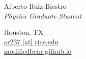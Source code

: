 \documentclass[letterpaper,11pt,notitlepage]{article}
\newcommand{\hmargin}{1.7cm} %
\begin{document}
\pagestyle{fancy}
\begin{minipage}[t][\hmargin][c]{0.60\textwidth}
	
    {\Huge{Alberto Ruiz-Biestro} }\\[0.8em]
	{\color{darkgray}\itshape\Large Physics Graduate Student}
	
\end{minipage}
\hfill
\begin{minipage}[t][\hmargin][c]{0.35\textwidth}
\raggedleft\color{darkgray}
Houston, TX\\
\href{mailto:ar237@rice.edu}{ar237 [at] rice.edu}\\
\href{https://modifiedbear.github.io/}{modifiedbear.github.io}\\
\end{minipage}

\vspace{0.5in}
\end{document}
